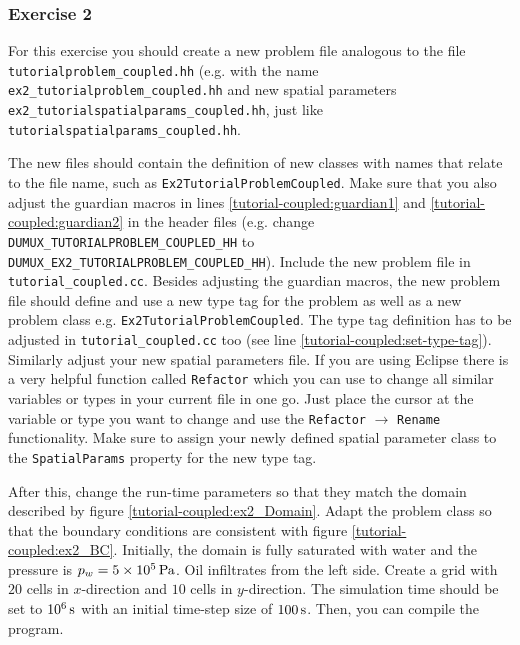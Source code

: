 \subsubsection{Exercise 2}
For this exercise you should create a new problem file analogous to
the file \texttt{tutorialproblem\_coupled.hh} (e.g. with the name
\texttt{ex2\_tutorialproblem\_coupled.hh} and new spatial parameters \texttt{ex2\_tutorialspatialparams\_coupled.hh},
just like \texttt{tutorialspatialparams\_coupled.hh}.

The new files should contain the definition of new classes with names
that relate to the file name, such as
\texttt{Ex2TutorialProblemCoupled}. Make sure that you also adjust the
guardian macros in lines \ref{tutorial-coupled:guardian1} and
\ref{tutorial-coupled:guardian2}
in the header files (e.g. change
\mbox{\texttt{DUMUX\_TUTORIALPROBLEM\_COUPLED\_HH}} to\\
\mbox{\texttt{DUMUX\_EX2\_TUTORIALPROBLEM\_COUPLED\_HH}}). Include the new problem file in \texttt{tutorial\_coupled.cc}. 
Besides adjusting the guardian macros, the new problem file should define and
use a new type tag for the problem as well as a new problem class
e.g. \mbox{\texttt{Ex2TutorialProblemCoupled}}. The type tag definition has to be adjusted in \texttt{tutorial\_coupled.cc} too (see line \ref{tutorial-coupled:set-type-tag}).
Similarly adjust your new spatial parameters file. If you are using Eclipse there is 
a very helpful function called \texttt{Refactor} which you can use to change
all similar variables or types in your current file in one go. Just place the cursor at the variable or type you want to change
and use the \texttt{Refactor} $\rightarrow$ \texttt{Rename} functionality. Make sure to assign your
newly defined spatial parameter class to the
\texttt{SpatialParams} property for the new
type tag. 

After this, change the run-time parameters so that they match the
domain described by figure \ref{tutorial-coupled:ex2_Domain}. Adapt
the problem class so that the boundary conditions are consistent with
figure \ref{tutorial-coupled:ex2_BC}. Initially, the domain is fully
saturated with water and the pressure is $p_w = \unit[5 \times
10^5]{Pa}$. Oil infiltrates from the left side. Create a grid
with $20$ cells in $x$-direction and $10$ cells in $y$-direction. The
simulation time should be set to $\unit[10^6]{s}$ with an
initial time-step size of $\unit[100]{s}$. Then, you can compile the program.


